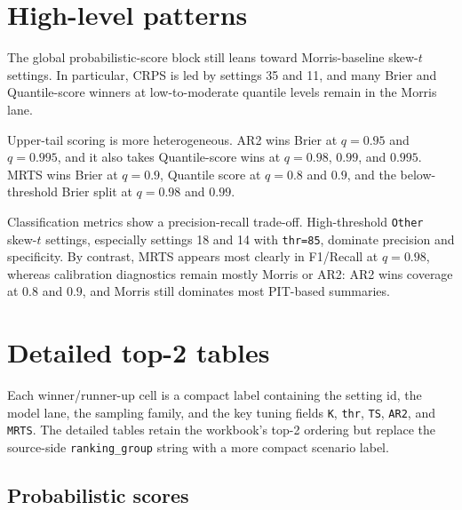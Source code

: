 \documentclass[11pt]{article}
\begin{document}
\section{High-level patterns}

The global probabilistic-score block still leans toward Morris-baseline
skew-\(t\) settings. In particular, CRPS is led by settings 35 and 11, and many
Brier and Quantile-score winners at low-to-moderate quantile levels remain in
the Morris lane.

Upper-tail scoring is more heterogeneous. AR2 wins Brier at \(q=0.95\) and
\(q=0.995\), and it also takes Quantile-score wins at \(q=0.98\), \(0.99\), and
\(0.995\). MRTS wins Brier at \(q=0.9\), Quantile score at \(q=0.8\) and
\(0.9\), and the below-threshold Brier split at \(q=0.98\) and \(0.99\).

Classification metrics show a precision-recall trade-off. High-threshold
\texttt{Other} skew-\(t\) settings, especially settings 18 and 14 with
\texttt{thr=85}, dominate precision and specificity. By contrast, MRTS appears
most clearly in F1/Recall at \(q=0.98\), whereas calibration diagnostics remain
mostly Morris or AR2: AR2 wins coverage at \(0.8\) and \(0.9\), and Morris
still dominates most PIT-based summaries.

\clearpage
\section{Detailed top-2 tables}

Each winner/runner-up cell is a compact label containing the setting id, the
model lane, the sampling family, and the key tuning fields
\texttt{K}, \texttt{thr}, \texttt{TS}, \texttt{AR2}, and \texttt{MRTS}. The
detailed tables retain the workbook's top-2 ordering but replace the
source-side \texttt{ranking\_group} string with a more compact scenario label.

\subsection{Probabilistic scores}
\end{document}
